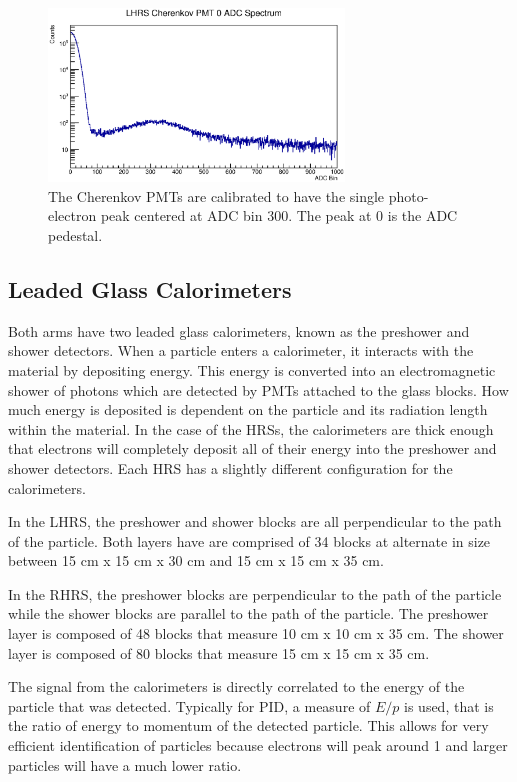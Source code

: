 \begin{figure}
\begin{center}
	\includegraphics[width=0.7\textwidth]{./setup/fig/cer_pmt.eps}
	\caption{The Cherenkov PMTs are calibrated to have the single photo-electron peak centered at ADC bin 300. The peak at 0 is the ADC pedestal.}
	\label{fig:cer_pmt}
\end{center}
\end{figure}

\subsection{Leaded Glass Calorimeters}

Both arms have two leaded glass calorimeters, known as the preshower and shower detectors. When a particle enters a calorimeter, it interacts with the material by depositing energy. This energy is converted into an electromagnetic shower of photons which are detected by PMTs attached to the glass blocks. How much energy is deposited is dependent on the particle and its radiation length within the material. In the case of the HRSs, the calorimeters are thick enough that electrons will completely deposit all of their energy into the preshower and shower detectors. Each HRS has a slightly different configuration for the calorimeters.

In the LHRS, the preshower and shower blocks are all perpendicular to the path of the particle. Both layers have are comprised of 34 blocks at alternate in size between 15 cm x 15 cm x 30 cm and 15 cm x 15 cm x 35 cm.

In the RHRS, the preshower blocks are perpendicular to the path of the particle while the shower blocks are parallel to the path of the particle. The preshower layer is composed of 48 blocks that measure 10 cm x 10 cm x 35 cm. The shower layer is composed of 80 blocks that measure 15 cm x 15 cm x 35 cm.

The signal from the calorimeters is directly correlated to the energy of the particle that was detected. Typically for PID, a measure of $E/p$ is used, that is the ratio of energy to momentum of the detected particle. This allows for very efficient identification of particles because electrons will peak around 1 and larger particles will have a much lower ratio.

